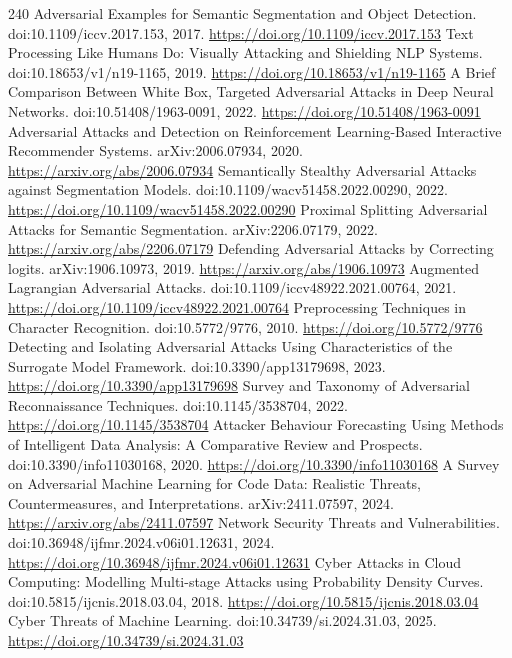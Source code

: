 \documentclass[11pt]{article}
\begin{document}
\begin{thebibliography}{240}
 Adversarial Examples for Semantic Segmentation and Object Detection. doi:10.1109/iccv.2017.153, 2017. \url{https://doi.org/10.1109/iccv.2017.153}
 Text Processing Like Humans Do: Visually Attacking and Shielding NLP Systems. doi:10.18653/v1/n19-1165, 2019. \url{https://doi.org/10.18653/v1/n19-1165}
 A Brief Comparison Between White Box, Targeted Adversarial Attacks in Deep Neural Networks. doi:10.51408/1963-0091, 2022. \url{https://doi.org/10.51408/1963-0091}
 Adversarial Attacks and Detection on Reinforcement Learning-Based Interactive Recommender Systems. arXiv:2006.07934, 2020. \url{https://arxiv.org/abs/2006.07934}
 Semantically Stealthy Adversarial Attacks against Segmentation Models. doi:10.1109/wacv51458.2022.00290, 2022. \url{https://doi.org/10.1109/wacv51458.2022.00290}
 Proximal Splitting Adversarial Attacks for Semantic Segmentation. arXiv:2206.07179, 2022. \url{https://arxiv.org/abs/2206.07179}
 Defending Adversarial Attacks by Correcting logits. arXiv:1906.10973, 2019. \url{https://arxiv.org/abs/1906.10973}
 Augmented Lagrangian Adversarial Attacks. doi:10.1109/iccv48922.2021.00764, 2021. \url{https://doi.org/10.1109/iccv48922.2021.00764}
 Preprocessing Techniques in Character Recognition. doi:10.5772/9776, 2010. \url{https://doi.org/10.5772/9776}
 Detecting and Isolating Adversarial Attacks Using Characteristics of the Surrogate Model Framework. doi:10.3390/app13179698, 2023. \url{https://doi.org/10.3390/app13179698}
 Survey and Taxonomy of Adversarial Reconnaissance Techniques. doi:10.1145/3538704, 2022. \url{https://doi.org/10.1145/3538704}
 Attacker Behaviour Forecasting Using Methods of Intelligent Data Analysis: A Comparative Review and Prospects. doi:10.3390/info11030168, 2020. \url{https://doi.org/10.3390/info11030168}
 A Survey on Adversarial Machine Learning for Code Data: Realistic Threats, Countermeasures, and Interpretations. arXiv:2411.07597, 2024. \url{https://arxiv.org/abs/2411.07597}
 Network Security Threats and Vulnerabilities. doi:10.36948/ijfmr.2024.v06i01.12631, 2024. \url{https://doi.org/10.36948/ijfmr.2024.v06i01.12631}
 Cyber Attacks in Cloud Computing: Modelling Multi-stage Attacks using Probability Density Curves. doi:10.5815/ijcnis.2018.03.04, 2018. \url{https://doi.org/10.5815/ijcnis.2018.03.04}
 Cyber Threats of Machine Learning. doi:10.34739/si.2024.31.03, 2025. \url{https://doi.org/10.34739/si.2024.31.03}

\end{thebibliography}
\end{document}

